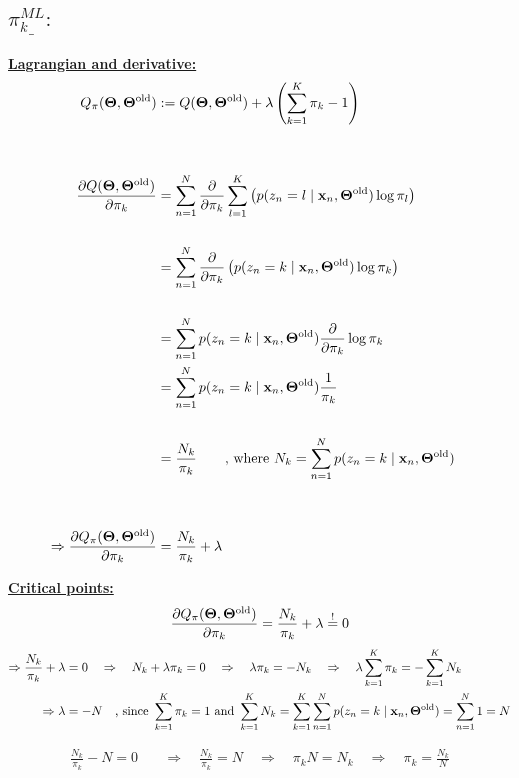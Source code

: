 \begin{enumerate}
   
   \subsection*{$\underline{\pi_k^{ML}:}$}
   \underline{\textbf{Lagrangian and derivative:}}
   \begin{align*}
      Q_\pi(\bold{\Theta}, \bold{\Theta}^{\text{old}}) &:= Q(\bold{\Theta}, \bold{\Theta}^{\text{old}}) + \lambda \left(\sum_{k=1}^K \pi_k - 1\right) \\
      & \\
      & \\
      \frac{\partial Q(\bold{\Theta}, \bold{\Theta}^{\text{old}})}{\partial \pi_k} &= \sum_{n=1}^N \frac{\partial}{\partial \pi_k}\sum_{l=1}^K\left(p(z_n = l \mid \bold{x}_n, \bold{\Theta}^{\text{old}}) \log\pi_l \right) \\
      & \\
      &= \sum_{n=1}^N \frac{\partial}{\partial \pi_k}\left(p(z_n = k \mid \bold{x}_n, \bold{\Theta}^{\text{old}}) \log\pi_k \right) \\
      & \\
      &= \sum_{n=1}^N p(z_n = k \mid \bold{x}_n, \bold{\Theta}^{\text{old}}) \frac{\partial}{\partial \pi_k} \log\pi_k
      & \\
      &= \sum_{n=1}^N p(z_n = k \mid \bold{x}_n, \bold{\Theta}^{\text{old}}) \frac{1}{\pi_k}\\
      & \\
      &= \frac{N_k}{\pi_k} \qquad \text{, where } N_k = \sum_{n=1}^N p(z_n = k \mid \bold{x}_n,\bold{\Theta}^{\text{old}})\\ 
      & \\
      & \\
      \Rightarrow \frac{\partial Q_\pi(\bold{\Theta}, \bold{\Theta}^{\text{old}})}{\partial \pi_k} &= \frac{N_k}{\pi_k} + \lambda \\
   \end{align*}
   
   \underline{\textbf{Critical points:}}
   \[\frac{\partial Q_\pi(\bold{\Theta}, \bold{\Theta}^{\text{old}})}{\partial \pi_k} = \frac{N_k}{\pi_k} + \lambda \overset{!}{=} 0\]
   \begin{align*}
       \Rightarrow \frac{N_k}{\pi_k} +  \lambda &= 0 \quad \Rightarrow \quad N_k + \lambda \pi_k = 0 \quad \Rightarrow \quad \lambda \pi_k = -N_k \quad \Rightarrow \quad \lambda \sum_{k=1}^K \pi_k = - \sum_{k=1}^K N_k \\
      \Rightarrow \lambda &= -N \quad \text{, since } \sum_{k=1}^K \pi_k = 1 \text{ and }\sum_{k=1}^K N_k = \sum_{k=1}^K \sum_{n=1}^N p(z_n = k \mid \bold{x}_n, \bold{\Theta}^{\text{old}}) = \sum_{n=1}^N 1 = N
   \end{align*}
   
   
   \begin{align*}
     \frac{N_k}{\pi_k} - N = 0 \quad  &\Rightarrow \quad \frac{N_k}{\pi_k} = N \quad \Rightarrow \quad \pi_k N = N_k \quad \Rightarrow \quad \pi_k = \frac{N_k}{N}   
   \end{align*}
   

\end{enumerate}
